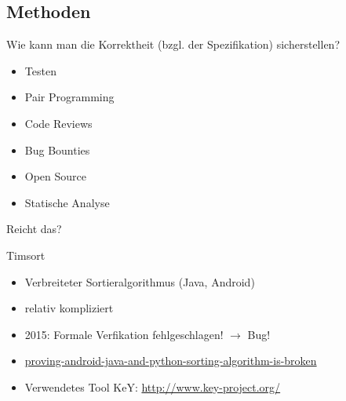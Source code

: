 \documentclass[aspectratio=169]{beamer}
\begin{document}
\subsection{Methoden}
\begin{frame}
  Wie kann man die Korrektheit (bzgl. der Spezifikation) sicherstellen?
  \vfill
  \begin{itemize}
  \item Testen
  \item Pair Programming
  \item Code Reviews
  \item Bug Bounties
  \item Open Source
  \item Statische Analyse \pause
  \end{itemize}
  \vfill
  \begin{center}
    Reicht das? 
  \end{center}
\end{frame}
\begin{frame}
  \begin{center}
    \Large{Timsort}
  \end{center}
  \begin{itemize}
  \item Verbreiteter Sortieralgorithmus (Java, Android)
  \item relativ kompliziert
  \item 2015: Formale Verfikation fehlgeschlagen! $\rightarrow$ Bug!
  \item \href{http://envisage-project.eu/proving-android-java-and-python-sorting-algorithm-is-broken-and-how-to-fix-it/}{proving-android-java-and-python-sorting-algorithm-is-broken}
  \item Verwendetes Tool KeY: \url{http://www.key-project.org/}
  \end{itemize}
\end{frame}
\end{document}
